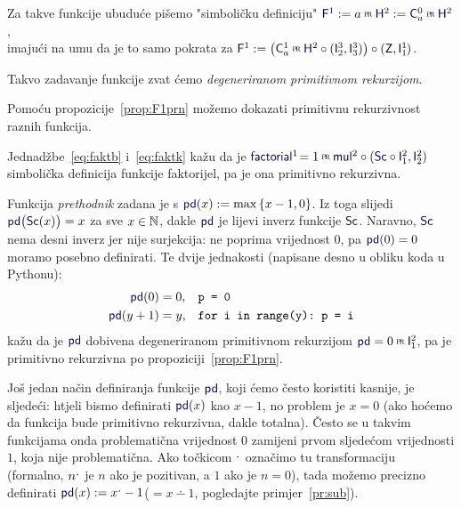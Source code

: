 \begin{definicija}[{name=[degenerirana primitivna rekurzija]}]\label{def:F1prn}
	Za takve funkcije ubuduće pišemo "simboličku definiciju" $\f F^1:=a\pr\f H^2:=\f C_a^0\pr\f H^2$,\\ imajući na umu da je to samo pokrata za $\f F^1:=\bigl(\f C_a^1\pr\f H^2\circ(\f I_2^3,\f I_3^3)\bigr)\circ(\f Z,\f I_1^1\mspace{-1mu})$.

Takvo zadavanje funkcije zvat ćemo \emph{degeneriranom primitivnom rekurzijom}.
\end{definicija}

Pomoću propozicije~\ref{prop:F1prn} možemo dokazati primitivnu rekurzivnost raznih funkcija.%

\begin{primjer}[{name=[primitivna rekurzivnost funkcije faktorijel]}]\label{pr:factorialprn}
Jednadžbe~\eqref{eq:faktb} i~\eqref{eq:faktk} kažu da je $\f{factorial}^1\!=1\pr\f{mul}^2\circ(\f{Sc}\circ\f I_1^2,\f I_2^2)$\\ simbolička definicija funkcije faktorijel, pa je ona primitivno rekurzivna.
\end{primjer}

\begin{primjer}[{name=[primitivna rekurzivnost funkcije prethodnik]}]
	Funkcija \emph{prethodnik} zadana je s $\f{pd}(x):=\max\,\{x-1,0\}$. Iz toga slijedi $\f{pd}\bigl(\f{Sc}(x)\bigr)=x$ za sve $x\in{\mathbb N}$, dakle $\f{pd}$ je lijevi inverz funkcije $\f{Sc}$. Naravno, $\f{Sc}$ nema desni inverz jer nije surjekcija: ne poprima vrijednost $0$, pa $\f{pd}(0)=0$ moramo posebno definirati. Te dvije jednakosti (napisane desno u obliku koda u Pythonu):
\begin{align}
	\f{pd}(0)&=0\text,&&\texttt{p = 0}\\
	\f{pd}(y+1)&=y\text,&&\texttt{for i in range(y):~p = i}
\end{align}
kažu da je $\f{pd}$ dobivena degeneriranom primitivnom rekurzijom $\f{pd}=0\pr\f I_1^2$, pa je primitivno rekurzivna po propoziciji~\ref{prop:F1prn}.
\end{primjer}

\begin{napomena}[{name=[zamjena nule jedinicom u nekim brojevnim funkcijama]}]\label{nap:crtica}
	Još jedan način definiranja funkcije $\f{pd}$, koji ćemo često koristiti kasnije, je sljedeći: htjeli bismo definirati $\f{pd}(x)$ kao $x-1$, no problem je $x=0$ (ako hoćemo da funkcija bude primitivno rekurzivna, dakle totalna). Često se u takvim funkcijama onda problematična vrijednost $0$ zamijeni prvom sljedećom vrijednosti $1$, koja nije problematična. Ako točkicom $\sp{\text{\normalsize.}}$ označimo tu transformaciju (formalno, $n\sp{\text{\normalsize.}}$ je $n$ ako je pozitivan, a $1$ ako je $n=0$), tada možemo precizno definirati $\f{pd}(x):=x\bump-1$($=x\dotminus1$, pogledajte primjer~\ref{pr:sub}).
\end{napomena}

